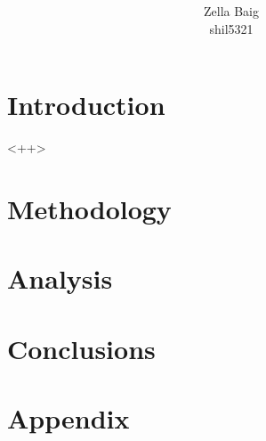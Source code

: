 \documentclass[a4paper]{article}
\title{\color{purply} \Huge <++>}
\author{\LARGE Zella Baig\\
shil5321}
\begin{document}
\maketitle
\thispagestyle{empty}
\begin{abstract}
\noindent <++>
\end{abstract}
\newpage
\tableofcontents
\thispagestyle{empty}
\newpage
\setcounter{page}{1}
\section{Introduction}
<++>

\newpage
\section{Methodology}%

\newpage
\section{Analysis}%

\newpage
\section{Conclusions}%

\newpage
\section{Appendix}
\newpage
\end{document}

